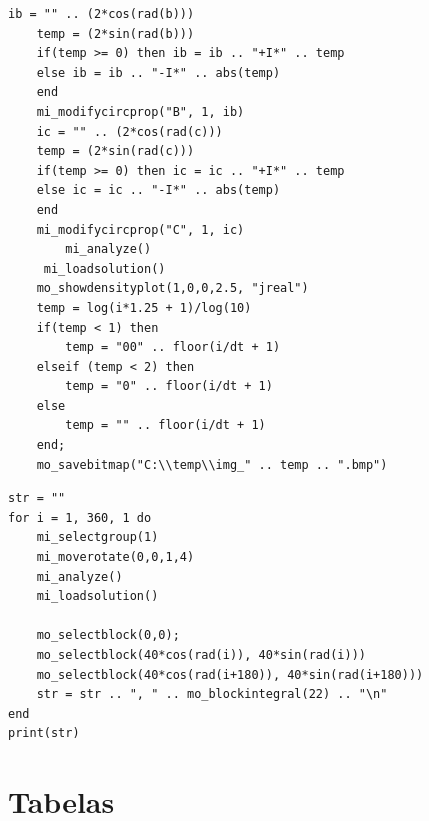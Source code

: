 \documentclass[
	12pt,				%
	openright,			%
	twoside,			%
	a4paper,			%
	english,			%
	french,				%
	spanish,			%
	brazil,				%
	]{abntex2}
\begin{document}
\begin{apendicesenv}
\begin{lstlisting}[caption={Imagem para video do campo girante}]
	ib = "" .. (2*cos(rad(b)))
	temp = (2*sin(rad(b)))
	if(temp >= 0) then ib = ib .. "+I*" .. temp
	else ib = ib .. "-I*" .. abs(temp)
	end
	mi_modifycircprop("B", 1, ib)
	ic = "" .. (2*cos(rad(c)))
	temp = (2*sin(rad(c)))
	if(temp >= 0) then ic = ic .. "+I*" .. temp
	else ic = ic .. "-I*" .. abs(temp)
	end
	mi_modifycircprop("C", 1, ic)
    	mi_analyze()
   	 mi_loadsolution()
	mo_showdensityplot(1,0,0,2.5, "jreal")	
	temp = log(i*1.25 + 1)/log(10)
	if(temp < 1) then
		temp = "00" .. floor(i/dt + 1)
	elseif (temp < 2) then
		temp = "0" .. floor(i/dt + 1)
	else
		temp = "" .. floor(i/dt + 1)
	end;	
	mo_savebitmap("C:\\temp\\img_" .. temp .. ".bmp")
\end{lstlisting}

\newpage

\begin{lstlisting}[caption={Calculo do toque de maneira estacionário}]
str = ""
for i = 1, 360, 1 do
	mi_selectgroup(1)
	mi_moverotate(0,0,1,4)
	mi_analyze()
	mi_loadsolution()

	mo_selectblock(0,0);
	mo_selectblock(40*cos(rad(i)), 40*sin(rad(i)))
	mo_selectblock(40*cos(rad(i+180)), 40*sin(rad(i+180)))
	str = str .. ", " .. mo_blockintegral(22) .. "\n"
end
print(str)
\end{lstlisting}

\chapter{Tabelas \label{ch:tabelas}}


\end{apendicesenv}
\end{document}
